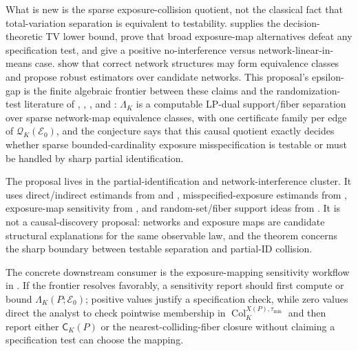 \documentclass[11pt]{article}
\theoremstyle{definition}
\theoremstyle{plain}
\theoremstyle{remark}
\begin{document}
What is new is the sparse exposure-collision quotient, not the classical fact that total-variation separation is equivalent to testability.  \citet[Chapter~6]{LeCam1986} supplies the decision-theoretic TV lower bound, \citet[abstract and main result]{GaoHarshawSavjeWang2026} prove that broad exposure-map alternatives defeat any specification test, and \citet[Section~4, Proposition~4.1 and Theorem~4.2]{GaoHarshawSavjeWang2026} give a positive no-interference versus network-linear-in-means case.  \citet[Sections~4--5]{WeinsteinNevo2026} show that correct network structures may form equivalence classes and propose robust estimators over candidate networks.  This proposal's epsilon-gap is the finite algebraic frontier between these claims and the randomization-test literature of \citet[Sections~2--3]{HoshinoYanagi2023}, \citet[Sections~2--3]{BasseFellerToulis2019}, \citet[Sections~2--4]{PuelzBasseFellerToulis2022}, and \citet[Sections~2--4]{AtheyEcklesImbens2018}: \(\Lambda_K\) is a computable LP-dual support/fiber separation over sparse network-map equivalence classes, with one certificate family per edge of \(\mathcal Q_K(\mathcal E_0)\), and the conjecture says that this causal quotient exactly decides whether sparse bounded-cardinality exposure misspecification is testable or must be handled by sharp partial identification.

The proposal lives in the partial-identification and network-interference cluster.  It uses direct/indirect estimands from \citet{HudgensHalloran2008} and \citet{AronowSamii2017}, misspecified-exposure estimands from \citet{Savje2024}, exposure-map sensitivity from \citet{SchroderOprescuFeuerriegelKallus2026}, and random-set/fiber support ideas from \citet{BeresteanuMolchanovMolinari2011}.  It is not a causal-discovery proposal: networks and exposure maps are candidate structural explanations for the same observable law, and the theorem concerns the sharp boundary between testable separation and partial-ID collision.

The concrete downstream consumer is the exposure-mapping sensitivity workflow in \citet{SchroderOprescuFeuerriegelKallus2026}.  If the frontier resolves favorably, a sensitivity report should first compute or bound \(\Lambda_K(P;\mathcal E_0)\); positive values justify a specification check, while zero values direct the analyst to check pointwise membership in \(\operatorname{Col}_{K}^{X(P),\tau_{\min}}\) and then report either \(\mathsf C_K(P)\) or the nearest-colliding-fiber closure without claiming a specification test can choose the mapping.
\end{document}
